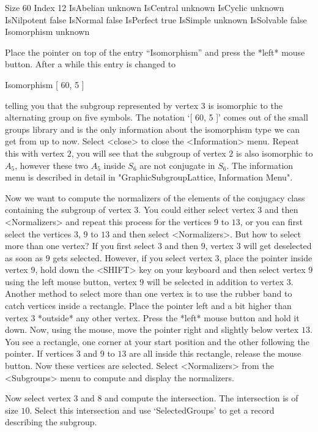 \begintt
Size        60
Index       12
IsAbelian   unknown
IsCentral   unknown
IsCyclic    unknown
IsNilpotent false
IsNormal    false
IsPerfect   true
IsSimple    unknown
IsSolvable  false
Isomorphism unknown
\endtt

Place the pointer on top of the entry  ``Isomorphism'' and press the *left*
mouse button.  After a while this entry is changed to

\begintt
Isomorphism [ 60, 5 ]
\endtt

telling you that the subgroup represented by vertex $3$ is isomorphic to
the alternating group on five symbols.  The notation `[ 60, 5 ]' comes out
of the small groups library and is the only information about the
isomorphism type we can get from {} up to now. Select <close> to close
the <Information> menu.  Repeat this with vertex $2$, you will see that the
subgroup of vertex $2$ is also isomorphic to $A_5$, however these two $A_5$
inside $S_6$ are not conjugate in $S_6$.  The information menu is described
in detail in "GraphicSubgroupLattice, Information Menu".

Now we want to compute the normalizers of the elements of the conjugacy
class containing the subgroup of vertex $3$.  You could either select
vertex $3$ and then <Normalizers> and repeat this process for the vertices
$9$ to $13$, or you can first select the vertices $3$, $9$ to $13$ and then
select <Normalizers>.  But how to select more than one vertex?  If you
first select $3$ and then $9$, vertex $3$ will get deselected as soon as
$9$ gets selected.  However, if you select vertex $3$, place the pointer
inside vertex $9$, hold down the <SHIFT> key on your keyboard and then
select vertex $9$ using the left mouse button, vertex $9$ will be selected
in addition to vertex $3$.  Another method to select more than one vertex
is to use the rubber band to catch vertices inside a rectangle.  Place the
pointer left and a bit higher than vertex $3$ *outside* any other vertex.
Press the *left* mouse button and hold it down.  Now, using the mouse, move
the pointer right and slightly below vertex $13$.  You see a rectangle, one
corner at your start position and the other following the pointer.  If
vertices $3$ and $9$ to $13$ are all inside this rectangle, release the
mouse button.  Now these vertices are selected.  Select <Normalizers> from
the <Subgroups> menu to compute and display the normalizers.

Now select vertex $3$ and $8$ and compute the intersection.  The
intersection is of size $10$.  Select this intersection and use
`SelectedGroups' to get a {\GAP} record describing the subgroup.

